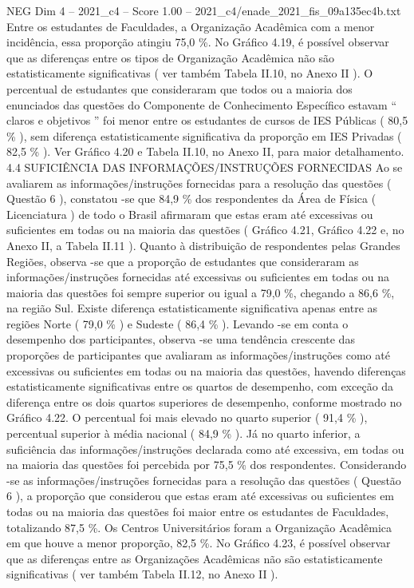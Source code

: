 \begin{textsample}{NEG Dim 4 – 2021\_c4 – Score 1.00 – 2021\_c4/enade\_2021\_fis\_09a135ec4b.txt}
Entre os estudantes de Faculdades, a Organização Acadêmica com a menor incidência, essa proporção atingiu 75,0 \%.
No Gráfico 4.19, é possível observar que as diferenças entre os tipos de Organização Acadêmica não são estatisticamente significativas ( ver também Tabela II.10, no Anexo II ).
O percentual de estudantes que consideraram que todos ou a maioria dos enunciados das questões do Componente de Conhecimento Específico estavam “ claros e objetivos ” foi menor entre os estudantes de cursos de IES Públicas ( 80,5 \% ), sem diferença estatisticamente significativa da proporção em IES Privadas ( 82,5 \% ).
Ver Gráfico 4.20 e Tabela II.10, no Anexo II, para maior detalhamento. 4.4 SUFICIÊNCIA DAS INFORMAÇÕES/INSTRUÇÕES FORNECIDAS Ao se avaliarem as informações/instruções fornecidas para a resolução das questões ( Questão 6 ), constatou -se que 84,9 \% dos respondentes da Área de Física ( Licenciatura ) de todo o Brasil afirmaram que estas eram até excessivas ou suficientes em todas ou na maioria das questões ( Gráfico 4.21, Gráfico 4.22 e, no Anexo II, a Tabela II.11 ).
Quanto à distribuição de respondentes pelas Grandes Regiões, observa -se que a proporção de estudantes que consideraram as informações/instruções fornecidas até excessivas ou suficientes em todas ou na maioria das questões foi sempre superior ou igual a 79,0 \%, chegando a 86,6 \%, na região Sul.
Existe diferença estatisticamente significativa apenas entre as regiões Norte ( 79,0 \% ) e Sudeste ( 86,4 \% ).
Levando -se em conta o desempenho dos participantes, observa -se uma tendência crescente das proporções de participantes que avaliaram as informações/instruções como até excessivas ou suficientes em todas ou na maioria das questões, havendo diferenças estatisticamente significativas entre os quartos de desempenho, com exceção da diferença entre os dois quartos superiores de desempenho, conforme mostrado no Gráfico 4.22.
O percentual foi mais elevado no quarto superior ( 91,4 \% ), percentual superior à média nacional ( 84,9 \% ).
Já no quarto inferior, a suficiência das informações/instruções declarada como até excessiva, em todas ou na maioria das questões foi percebida por 75,5 \% dos respondentes.
Considerando -se as informações/instruções fornecidas para a resolução das questões ( Questão 6 ), a proporção que considerou que estas eram até excessivas ou suficientes em todas ou na maioria das questões foi maior entre os estudantes de Faculdades, totalizando 87,5 \%.
Os Centros Universitários foram a Organização Acadêmica em que houve a menor proporção, 82,5 \%.
No Gráfico 4.23, é possível observar que as diferenças entre as Organizações Acadêmicas não são estatisticamente significativas ( ver também Tabela II.12, no Anexo II ).

\end{textsample}
